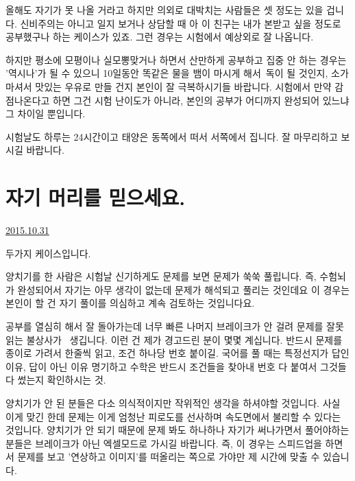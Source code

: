 올해도 자기가 못 나올 거라고 하지만 의외로 대박치는 사람들은 셋 정도는 있을 겁니다.
신비주의는 아니고 일지 보거나 상담할 때 아 이 친구는 내가 본받고 싶을 정도로 공부했구나 하는 케이스가 있죠.
그런 경우는 시험에서 예상외로 잘 나옵니다.
\vspace{5mm}

하지만 평소에 모평이나 실모뽕맞거나 하면서 산만하게 공부하고 집중 안 하는 경우는 '역시나'가 될 수 있으니
10일동안 똑같은 물을 뱀이 마시게 해서 독이 될 것인지, 소가 마셔서 맛있는 우유로 만들 건지 본인이 잘 극복하시기들 바랍니다.
시험에서 만약 감점나온다고 하면 그건 시험 난이도가 아니라, 본인의 공부가 어디까지 완성되어 있느냐 그 차이일 뿐입니다.
\vspace{5mm}

시험날도 하루는 24시간이고 태양은 동쪽에서 떠서 서쪽에서 집니다. 잘 마무리하고 보시길 바랍니다.
\vspace{5mm}






\section{자기 머리를 믿으세요.}
\href{https://www.kockoc.com/Apoc/458132}{2015.10.31}

\vspace{5mm}

두가지 케이스입니다.
\vspace{5mm}

양치기를 한 사람은 시험날 신기하게도 문제를 보면 문제가 쑥쑥 풀립니다.
즉, 수험뇌가 완성되어서 자기는 아무 생각이 없는데 문제가 해석되고 풀리는 것인데요
이 경우는 본인이 할 건 자기 풀이를 의심하고 계속 검토하는 것입니다요.
\vspace{5mm}

공부를 열심히 해서 잘 돌아가는데 너무 빠른 나머지 브레이크가 안 걸려 문제를 잘못 읽는 불상사가  생깁니다.
이런 건 제가 경고드린 분이 몇몇 계십니다. 반드시 문제를 종이로 가려서 한줄씩 읽고, 조건 하나당 번호 붙이길.
국어를 풀 때는 특정선지가 답인 이유, 답이 아닌 이유 명기하고
수학은 반드시 조건들을 찾아내 번호 다 붙여서 그것들 다 썼는지 확인하시는 것.
\vspace{5mm}

양치기가 안 된 분들은 다소 의식적이지만 작위적인 생각을 하셔야할 것입니다. 사실 이게 맞긴 한데
문제는 이게 엄청난 피로도를 선사하며 속도면에서 불리할 수 있다는 것입니다.
양치기가 안 되기 때문에 문제 봐도 하나하나 자기가 써나가면서 풀어야하는 분들은 브레이크가 아닌 엑셀모드로 가시길 바랍니다.
즉, 이 경우는 스피드업을 하면서 문제를 보고 '연상하고 이미지'를 떠올리는 쪽으로 가야만 제 시간에 맞출 수 있습니다.
\vspace{5mm}

